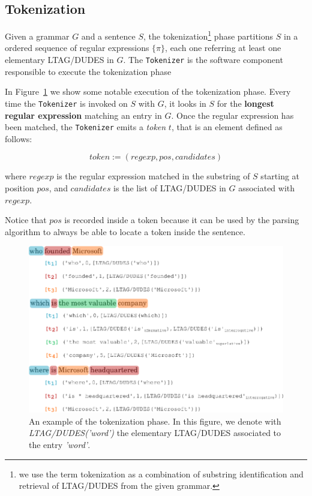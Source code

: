 \subsection{Tokenization}
\label{sec:parsing-tokenization}

Given a grammar $G$ and a sentence $S$, the tokenization\footnote{we use the term tokenization as a combination of substring identification and retrieval of LTAG/DUDES from the given grammar.} phase partitions $S$ in a ordered sequence of regular expressions $\{\pi\}$, each one referring at least one elementary LTAG/DUDES in $G$.
%
The \texttt{Tokenizer} is the software component responsible to execute the tokenization phase

In Figure~\ref{fig:tokenization-sample} we show some notable execution of the tokenization phase.
%
Every time the \texttt{Tokenizer} is invoked on $S$ with $G$, it looks in $S$ for the \textbf{longest regular expression} matching an entry in $G$.
%
Once the regular expression has been matched, the \texttt{Tokenizer} emits a \textit{token} $t$, that is an element defined as follows:

\begin{equation}
\label{eqn:token}
token:=(regexp,pos,candidates)
\end{equation}

where
$regexp$ is the regular expression matched in the substring of $S$ starting at position $pos$, and
$candidates$ is the list of LTAG/DUDES in $G$ associated with $regexp$.

Notice that $pos$ is recorded inside a token because it can be used by the parsing algorithm to always be able to locate a token inside the sentence.

\begin{figure}[tp]
	\label{fig:tokenization-sample}
	\centering
	\includegraphics[width=0.8\columnwidth]{./fig/tokenizer-sample}
	\caption{An example of the tokenization phase. In this figure, we denote with \textit{LTAG/DUDES('word')} the elementary LTAG/DUDES associated to the entry \textit{'word'}.}
\end{figure}


